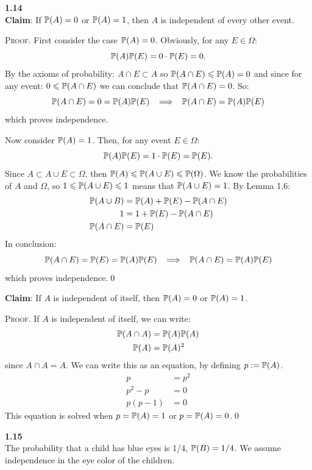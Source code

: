 \newpage\noindent
\textbf{1.14}\\  %
\textbf{Claim}: If $\P(A) = 0$ or $\P(A) = 1$, then $A$ is independent of every other event.

\bigskip\noindent
\textsc{Proof}. First consider the case $\P(A) = 0$. Obviously, for any $E\in\Omega$:
$$
\P(A)\P(E) = 0\cdot\P(E) = 0.
$$
By the axioms of probability: $A\cap E\subset A$ so $\P(A\cap E) \leq \P(A) = 0$
and since for any event: $0\leq \P(A\cap E)$ we can conclude that $\P(A\cap E) = 0$.
So:
$$
\P(A\cap E) = 0 = \P(A)\P(E)
\;\;\implies\;\;
\P(A\cap E) = \P(A)\P(E)
$$
which proves independence.

Now consider $\P(A) = 1$. Then, for any event $E\in\Omega$:
$$
\P(A)\P(E) = 1\cdot\P(E) = \P(E).
$$
Since $A\subset A\cup E \subset \Omega$, then $\P(A)\leq\P(A\cup E) \leq \P(\Omega)$. We know the probabilities
of $A$ and $\Omega$, so $1\leq \P(A\cup E)\leq 1$ means that $\P(A\cup E) = 1$. By Lemma 1.6:
\begin{align*}
    \P(A\cup B) &= \P(A) + \P(E) - \P(A\cap E) \\
    1 &= 1 + \P(E) - \P(A\cap E) \\
    \P(A\cap E) &= \P(E)
\end{align*}
In conclusion:
$$
\P(A\cap E) = \P(E) = \P(A)\P(E)
\imp
\P(A\cap E) = \P(A)\P(E)
$$
which proves independence.\qed

\bigskip\bigskip\noindent
\textbf{Claim}: If $A$ is independent of itself, then $\P(A) = 0$ or $\P(A) = 1$.

\bigskip\noindent\textsc{Proof}. If $A$ is independent of itself, we can write:
\begin{align*}
    \P(A\cap A) &= \P(A)\P(A) \\
    \P(A) &= \P(A)^2
\end{align*}
since $A\cap A = A$. We can write this as an equation, by defining $p := \P(A)$.
\begin{align*}
    p &= p^2 \\
    p^2 - p &= 0 \\
    p(p - 1) &= 0
\end{align*}
This equation is solved when $p = \P(A) = 1$ or $p = \P(A) = 0$.\qed


\newpage\noindent
\textbf{1.15}\\  %
The probability that a child has blue eyes is 1/4, $\P(B) = 1/4$. We assume independence
in the eye color of the children.

